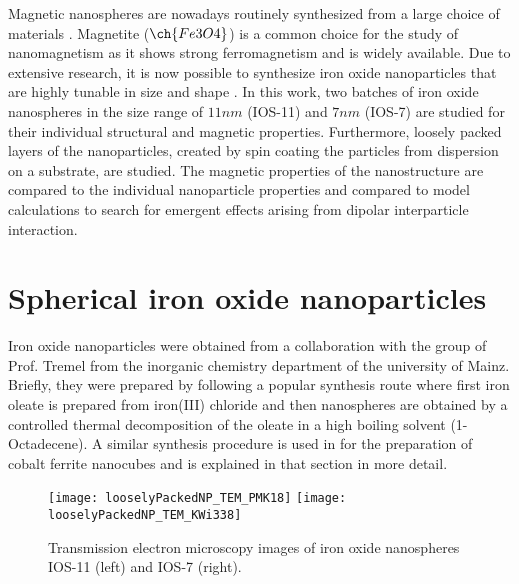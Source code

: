 \documentclass[\main/dresen_thesis.tex]{subfiles}
\begin{document}
  Magnetic nanospheres are nowadays routinely synthesized from a large choice of materials \cite{Gubin_2005_Magne}.
  Magnetite ($\ch{Fe3O4}$) is a common choice for the study of nanomagnetism as it shows strong ferromagnetism and is widely available.
  Due to extensive research, it is now possible to synthesize iron oxide nanoparticles that are highly tunable in size and shape \cite{Wetterskog_2014_Preci}.
  In this work, two batches of iron oxide nanospheres in the size range of $11 \unit{nm}$ (IOS-11) and $7 \unit{nm}$ (IOS-7) are studied for their individual structural and magnetic properties.
  Furthermore, loosely packed layers of the nanoparticles, created by spin coating the particles from dispersion on a substrate, are studied.
  The magnetic properties of the nanostructure are compared to the individual nanoparticle properties and compared to model calculations to search for emergent effects arising from dipolar interparticle interaction.

  \section{Spherical iron oxide nanoparticles}
  Iron oxide nanoparticles were obtained from a collaboration with the group of Prof. Tremel from the inorganic chemistry department of the university of Mainz.
  Briefly, they were prepared by following a popular synthesis route where first iron oleate is prepared from iron(III) chloride and then nanospheres are obtained by a controlled thermal decomposition of the oleate in a high boiling solvent (1-Octadecene).
  A similar synthesis procedure is used in  for the preparation of cobalt ferrite nanocubes and is explained in that section in more detail.

  \begin{figure}[tb]
    \centering
    \texttt{[image: looselyPackedNP\_TEM\_PMK18]}
    \texttt{[image: looselyPackedNP\_TEM\_KWi338]}
    \caption{\label{fig:looselyPackedNP:nanoparticle:tem}Transmission electron microscopy images of iron oxide nanospheres IOS-11 (left) and IOS-7 (right).}
  \end{figure}
\end{document}
